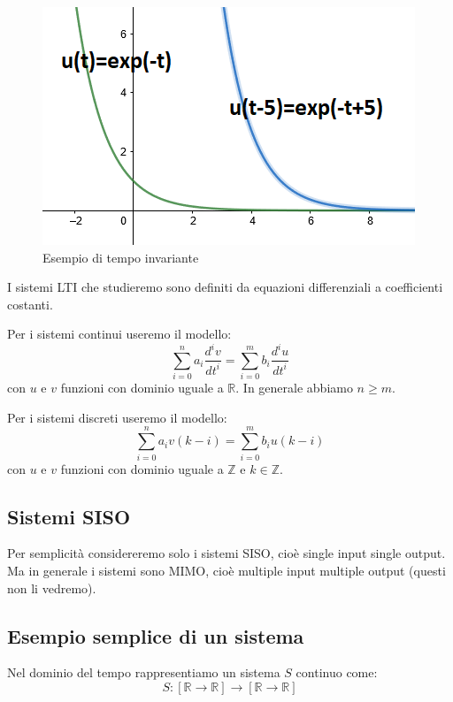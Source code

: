 \begin{figure}[h]
	\centering
	\includegraphics[width=0.7\linewidth]{immagini/esponenziale}
	\caption{ Esempio di tempo invariante }
	\label{fig:esponenziale}
\end{figure}

\pagebreak

I sistemi LTI che studieremo sono definiti da equazioni differenziali a coefficienti costanti.

Per i sistemi continui useremo il modello:
\begin{equation*}
\sum\limits_{i=0}^n a_{i} \frac{ d^{i} v }{ dt^{i}  } = \sum\limits_{i=0}^m b_{i} \frac{ d^{i} u }{ dt^{i}  }
\end{equation*}
con $u$ e $v$ funzioni con dominio uguale a $\mathbb{R}$. In generale abbiamo $n\geq m$.


Per i sistemi discreti useremo il modello:
\begin{equation*}
\sum\limits_{i=0}^n a_{i} v(k-i) = \sum\limits_{i=0}^m b_{i} u(k-i)
\end{equation*}
con $u$ e $v$ funzioni con dominio uguale a $\mathbb{Z}$ e $ k \in \mathbb{Z} $.

\subsection*{Sistemi SISO}
Per semplicità considereremo solo i sistemi SISO, cioè single input single output. Ma in generale i sistemi sono MIMO, cioè multiple input multiple output (questi non li vedremo).

\subsection*{Esempio semplice di un sistema}

Nel dominio del tempo rappresentiamo un sistema $S$ continuo come: \\
\begin{equation*}
S: [\mathbb{R} \rightarrow \mathbb{R}] \rightarrow [\mathbb{R} \rightarrow \mathbb{R}]
\end{equation*}

